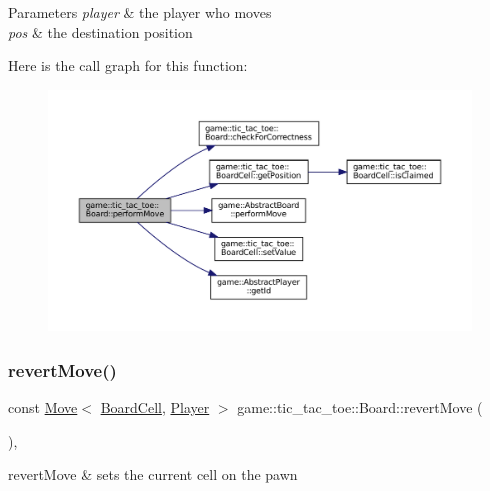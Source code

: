 \begin{DoxyParams}{Parameters}
{\em player} & the player who moves \\
\hline
{\em pos} & the destination position \\
\hline
\end{DoxyParams}
Here is the call graph for this function\+:
\nopagebreak
\begin{figure}[H]
\begin{center}
\leavevmode
\includegraphics[width=350pt]{classgame_1_1tic__tac__toe_1_1_board_a08d914b0a618b2e35dcd5016ceba1b23_cgraph}
\end{center}
\end{figure}
\mbox{\label{classgame_1_1tic__tac__toe_1_1_board_ac77aad0bb0945d12a959bb8db0e31908}} 
\subsubsection{\texorpdfstring{revert\+Move()}{revertMove()}}
{\footnotesize\ttfamily const \hyperlink{structgame_1_1_move}{Move}$<$ \hyperlink{classgame_1_1tic__tac__toe_1_1_board_cell}{Board\+Cell}, \hyperlink{classgame_1_1tic__tac__toe_1_1_player}{Player} $>$ game\+::tic\+\_\+tac\+\_\+toe\+::\+Board\+::revert\+Move (\begin{DoxyParamCaption}{ }\end{DoxyParamCaption})\hspace{0.3cm}{\ttfamily [override]}, {\ttfamily [virtual]}}



revert\+Move \& sets the current cell on the pawn 

